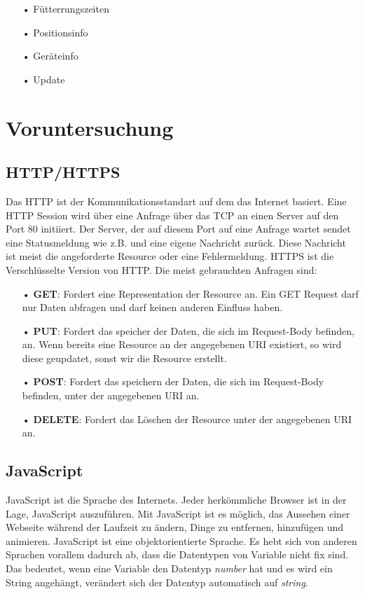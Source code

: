 \begin{itemize}
\item[•]Fütterrungszeiten
\item[•]Positionsinfo
\item[•]Geräteinfo
\item[•]Update
\end{itemize}

\section{Voruntersuchung}
\label{sec:voruntersuchung}

\subsection{HTTP/HTTPS}
\label{sec:vor-http}
Das \ac{HTTP} ist der Kommunikationsstandart auf dem das Internet basiert. Eine HTTP Session wird über eine Anfrage über das \ac{TCP} an einen Server auf den Port 80 initiiert. Der Server, der auf diesem Port auf eine Anfrage wartet sendet eine Statusmeldung wie z.B.  und eine eigene Nachricht zurück. Diese Nachricht ist meist die angeforderte Resource oder eine Fehlermeldung. \ac{HTTPS} ist die Verschlüsselte Version von \ac{HTTP}. Die meist gebrauchten Anfragen sind:

\begin{itemize}
\item[•] \textbf{GET}: Fordert eine Representation der Resource an. Ein GET Request darf nur Daten abfragen und darf keinen anderen Einfluss haben.
\item[•] \textbf{PUT}: Fordert das speicher der Daten, die sich im Request-Body befinden, an. Wenn bereits eine Resource an der angegebenen \ac{URI} existiert, so wird diese geupdatet, sonst wir die Resource erstellt.
\item[•] \textbf{POST}: Fordert das speichern der Daten, die sich im Request-Body befinden, unter der angegebenen \ac{URI} an. 
\item[•] \textbf{DELETE}: Fordert das Löschen der Resource unter der angegebenen \ac{URI} an.
\end{itemize}

\subsection{JavaScript}
\label{sec:vor-js}
JavaScript ist die Sprache des Internets. Jeder herkömmliche Browser ist in der Lage, JavaScript auszuführen. Mit JavaScript ist es möglich, das Aussehen einer Webseite während der Laufzeit zu ändern, Dinge zu entfernen, hinzufügen und animieren. JavaScript ist eine objektorientierte Sprache. Es hebt sich von anderen Sprachen vorallem dadurch ab, dass die Datentypen von Variable nicht fix sind. Das bedeutet, wenn eine Variable den Datentyp \textit{number} hat und es wird ein String angehängt, verändert sich der Datentyp automatisch auf \textit{string}.

